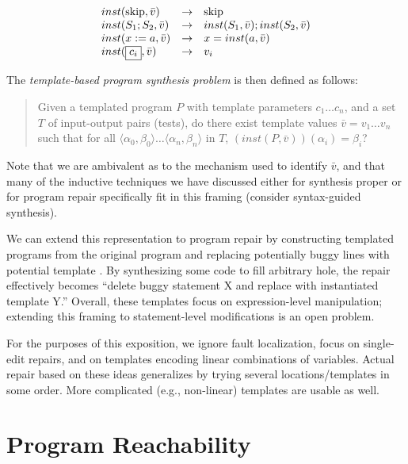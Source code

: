 \documentclass[11pt]{article}
\begin{document}
\begin{center}
\[
\begin{array}{lcl}
inst(\mbox{skip}, \bar{v}) & \rightarrow & \mbox{skip} \\
inst(S_1; S_2, \bar{v}) & \rightarrow & inst(S_1, \bar{v}); inst(S_2, \bar{v}) \\
inst(x := a, \bar{v}) & \rightarrow & x = inst(a, \bar{v}) \\
inst(\fbox{$\displaystyle c_i $}, \bar{v}) & \rightarrow & v_i 
\end{array}
\]
\end{center}

The \emph{template-based program synthesis problem} is then defined as follows: 
\begin{quote}
  Given a templated program $P$ with template parameters $c_1\ldots c_n$, and a
  set $T$ of input-output pairs (tests), do there exist template values
  $\bar{v}=v_1 \ldots v_n$ such that for all
  ${ \langle \alpha_0, \beta_0 \rangle \ldots \langle \alpha_n, \beta_n \rangle
  }$ in $T$, $(inst(P,\bar{v}))(\alpha_i) = \beta_i$?
\end{quote}

Note that we are ambivalent as to the mechanism used to identify $\bar{v}$, and
that many of the inductive techniques we have discussed either for synthesis
proper or for program repair specifically fit in this framing (consider
syntax-guided synthesis). 

We can extend this representation to program repair by constructing templated
programs from the original program and replacing potentially buggy lines with
potential template . By synthesizing some code to
fill arbitrary hole, the repair effectively becomes ``delete buggy statement X
and replace with instantiated template Y.'' Overall, these templates
focus on expression-level manipulation; extending this framing to
statement-level modifications is an open problem. 

For the purposes of this exposition, we ignore fault localization, focus on
single-edit repairs, and on templates encoding linear combinations of variables.
Actual repair based on these ideas generalizes by trying several
locations/templates in some order. More complicated (e.g., non-linear) templates
are usable as well.

\section{Program Reachability}
\end{document}
